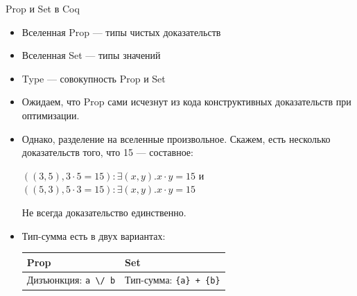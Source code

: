 \documentclass[aspectratio=169,dvipsnames,usenames]{beamer}
\begin{document}
\begin{frame}[fragile]{Prop и Set в Coq}
\begin{itemize}
\item Вселенная Prop --- типы чистых доказательств
\item Вселенная Set --- типы значений
\item Type --- совокупность Prop и Set
\item Ожидаем, что Prop сами исчезнут из кода конструктивных доказательств при оптимизации.

\item Однако, разделение на вселенные произвольное. Скажем, есть несколько доказательств того, что 15 --- составное:

$((3,5),3 \cdot 5 = 15) : \exists (x,y).x \cdot y = 15$
и
$((5,3),5 \cdot 3 = 15) : \exists (x,y).x \cdot y = 15$

Не всегда доказательство единственно.

\item Тип-сумма есть в двух вариантах:

\begin{center}\begin{tabular}{ll}
Prop & Set \\\hline
Дизъюнкция: \verb!a \/ b! & Тип-сумма: \verb!{a} + {b}!
\end{tabular}\end{center}
\end{itemize}

\end{frame}
\end{document}
